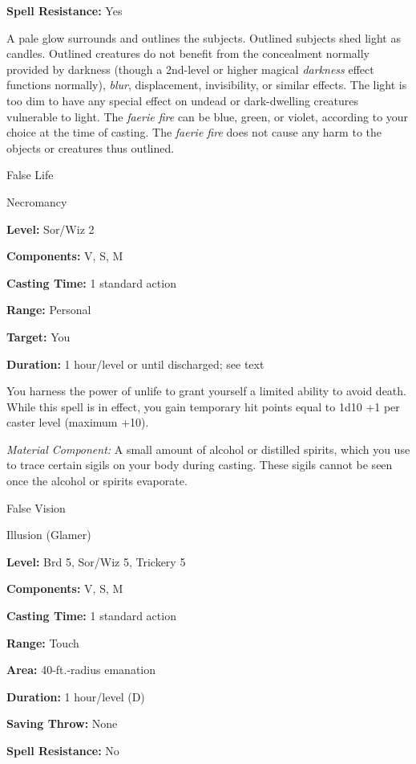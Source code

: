 \documentclass{article}
\begin{document}
\textbf{Spell Resistance:} Yes

A pale glow surrounds and outlines the subjects. Outlined subjects shed light as 
candles. Outlined creatures do not benefit from the concealment normally provided 
by darkness (though a 2nd-level or higher magical \textit{darkness }effect functions 
normally), \textit{blur}, displacement, invisibility, or similar effects. The light 
is too dim to have any special effect on undead or dark-dwelling creatures vulnerable 
to light. The \textit{faerie fire }can be blue, green, or violet, according to 
your choice at the time of casting. The \textit{faerie fire }does not cause any 
harm to the objects or creatures thus outlined.

\vspace{12pt}
False Life

Necromancy

\textbf{Level:} Sor/Wiz 2

\textbf{Components:} V, S, M

\textbf{Casting Time:} 1 standard action

\textbf{Range:} Personal

\textbf{Target:} You

\textbf{Duration:} 1 hour/level or until discharged; see text

You harness the power of unlife to grant yourself a limited ability to avoid death. 
While this spell is in effect, you gain temporary hit points equal to 1d10 +1 per 
caster level (maximum +10).

\textit{Material Component: }A small amount of alcohol or distilled spirits, which 
you use to trace certain sigils on your body during casting. These sigils cannot 
be seen once the alcohol or spirits evaporate.

\vspace{12pt}
False Vision

Illusion (Glamer)

\textbf{Level:} Brd 5, Sor/Wiz 5, Trickery 5

\textbf{Components:} V, S, M

\textbf{Casting Time:} 1 standard action

\textbf{Range:} Touch

\textbf{Area:} 40-ft.-radius emanation

\textbf{Duration:} 1 hour/level (D)

\textbf{Saving Throw:} None

\textbf{Spell Resistance:} No
\end{document}
